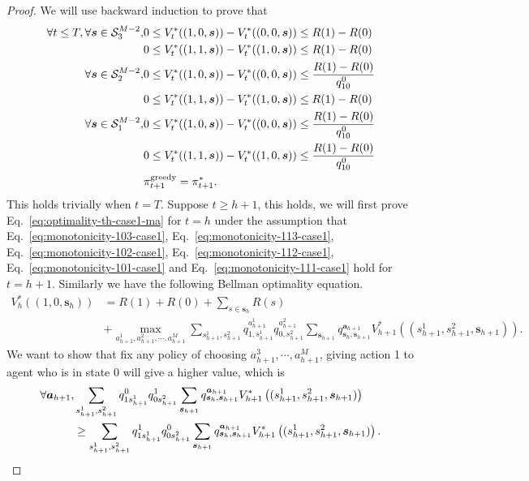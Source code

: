 \begin{proof}
We will use backward induction to prove that 
\begin{align}
    \forall t\leq T, \forall \bm{s}\in\mathcal{S}^{M-2}_3, &0\leq V_t^*((1,0,\bm{s}))-V_t^*((0,0,\bm{s}))\leq R(1)-R(0)\label{eq:monotonicity-103-case1}\\
    & 0\leq V_t^*((1,1,\bm{s}))-V_t^*((1,0,\bm{s}))\leq R(1)-R(0)\label{eq:monotonicity-113-case1}\\
    \forall \bm{s}\in\mathcal{S}^{M-2}_2, &0\leq V_t^*((1,0,\bm{s}))-V_t^*((0,0,\bm{s}))\leq \frac{R(1)-R(0)}{q^0_{10}}\label{eq:monotonicity-102-case1}\\
    & 0\leq V_t^*((1,1,\bm{s}))-V_t^*((1,0,\bm{s}))\leq R(1)-R(0)\label{eq:monotonicity-112-case1}\\
    \forall \bm{s}\in\mathcal{S}^{M-2}_1,&0\leq V_t^*((1,0,\bm{s}))-V_t^*((0,0,\bm{s}))\leq \frac{R(1)-R(0)}{q^0_{10}}\label{eq:monotonicity-101-case1}\\
    & 0\leq V_t^*((1,1,\bm{s}))-V_t^*((1,0,\bm{s}))\leq \frac{R(1)-R(0)}{q^0_{10}}\label{eq:monotonicity-111-case1}\\
    &\pi_{t+1}^{\text{greedy}}=\pi_{t+1}^*.\label{eq:optimality-th-case1-ma}
\end{align}
This holds trivially when $t=T$. Suppose $t\geq h+1$, this holds, we will first prove Eq.~\eqref{eq:optimality-th-case1-ma} for $t=h$ under the assumption that Eq.~\eqref{eq:monotonicity-103-case1}, Eq.~\eqref{eq:monotonicity-113-case1}, Eq.~\eqref{eq:monotonicity-102-case1}, Eq.~\eqref{eq:monotonicity-112-case1}, Eq.~\eqref{eq:monotonicity-101-case1} and Eq.~\eqref{eq:monotonicity-111-case1} hold for $t=h+1$.
Similarly we have the following Bellman optimality equation.
\begin{align*}
    V_h^*\left(\left(1,0,\bm{s}_{h}\right)\right)&=R(1)+R(0)+\sum_{s\in\bm{s}_h}R(s)\\&+\max_{a_{h+1}^1,a_{h+1}^2,\cdots,a_{h+1}^M}\sum_{s_{h+1}^1,s_{h+1}^2}q_{1,s_{h+1}^1}^{a_{h+1}^1}q_{0,s_{h+1}^2}^{a_{h+1}^2}\sum_{\bm{s}_{h+1}}q_{\bm{s}_h,\bm{s}_{h+1}}^{\bm{a}_{h+1}}V_{h+1}^*\left((s_{h+1}^1,s_{h+1}^2,\bm{s}_{h+1})\right).
\end{align*}
We want to show that fix any policy of choosing $a_{h+1}^3,\cdots,a_{h+1}^M$, giving action 1 to agent who is in state 0 will give a higher value, which is
\begin{align}
    \forall \bm{a}_{h+1}, &\sum_{s_{h+1}^1,s_{h+1}^2}q^0_{1s_{h+1}^1}q^1_{0s_{h+1}^2}\sum_{\bm{s}_{h+1}}q_{\bm{s}_h,\bm{s}_{h+1}}^{\bm{a}_{h+1}}V_{h+1}^*\left((s_{h+1}^1,s_{h+1}^2,\bm{s}_{h+1})\right)\notag\\&\geq \sum_{s_{h+1}^1,s_{h+1}^2}q^1_{1s_{h+1}^1}q^0_{0s_{h+1}^2}\sum_{\bm{s}_{h+1}}q_{\bm{s}_h,\bm{s}_{h+1}}^{\bm{a}_{h+1}}V_{h+1}^*\left((s_{h+1}^1,s_{h+1}^2,\bm{s}_{h+1})\right).\label{eq:switching-is-better}

\end{align}
\end{proof}
